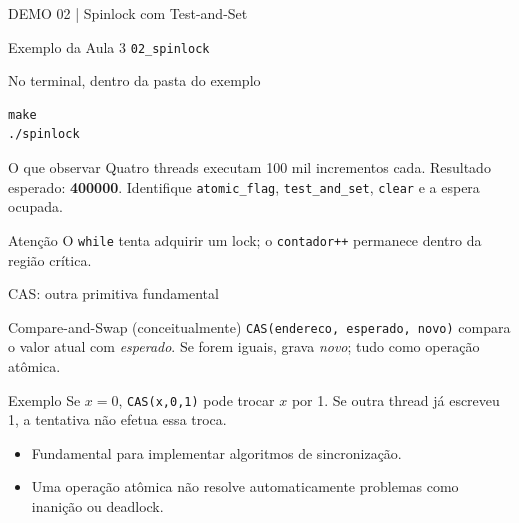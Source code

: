 \documentclass[aspectratio=169,11pt]{beamer}
\begin{document}
\begin{frame}[fragile]{DEMO 02 | Spinlock com Test-and-Set}
\small
\begin{block}{Exemplo da Aula 3}
\texttt{02\_spinlock}
\end{block}
\begin{block}{No terminal, dentro da pasta do exemplo}
\begin{verbatim}
make
./spinlock
\end{verbatim}
\end{block}
\begin{exampleblock}{O que observar}
Quatro threads executam 100 mil incrementos cada. Resultado esperado: \textbf{400000}. Identifique \texttt{atomic\_flag}, \texttt{test\_and\_set}, \texttt{clear} e a espera ocupada.
\end{exampleblock}
\begin{alertblock}{Atenção}
O \texttt{while} tenta adquirir um lock; o \texttt{contador++} permanece dentro da região crítica.
\end{alertblock}
\end{frame}

\begin{frame}{CAS: outra primitiva fundamental}
\small
\begin{block}{Compare-and-Swap (conceitualmente)}
\texttt{CAS(endereco, esperado, novo)} compara o valor atual com \emph{esperado}. Se forem iguais, grava \emph{novo}; tudo como operação atômica.
\end{block}
\begin{exampleblock}{Exemplo}
Se \(x=0\), \texttt{CAS(x,0,1)} pode trocar \(x\) por 1. Se outra thread já escreveu 1, a tentativa não efetua essa troca.
\end{exampleblock}
\begin{itemize}
\item Fundamental para implementar algoritmos de sincronização.
\item Uma operação atômica não resolve automaticamente problemas como inanição ou deadlock.
\end{itemize}
\end{frame}
\end{document}
